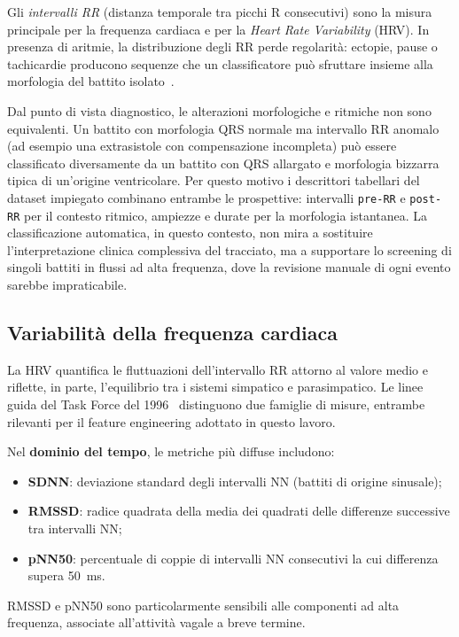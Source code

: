 Gli \emph{intervalli RR} (distanza temporale tra picchi R consecutivi) sono la misura principale per la frequenza cardiaca e per la \emph{Heart Rate Variability} (HRV).
In presenza di aritmie, la distribuzione degli RR perde regolarità: ectopie, pause o tachicardie producono sequenze che un classificatore può sfruttare insieme alla morfologia del battito isolato~\cite{taskforce1996hrv,dechazal2004automatic}.

Dal punto di vista diagnostico, le alterazioni morfologiche e ritmiche non sono equivalenti.
Un battito con morfologia QRS normale ma intervallo RR anomalo (ad esempio una extrasistole con compensazione incompleta) può essere classificato diversamente da un battito con QRS allargato e morfologia bizzarra tipica di un'origine ventricolare.
Per questo motivo i descrittori tabellari del dataset impiegato combinano entrambe le prospettive: intervalli \texttt{pre-RR} e \texttt{post-RR} per il contesto ritmico, ampiezze e durate per la morfologia istantanea.
La classificazione automatica, in questo contesto, non mira a sostituire l'interpretazione clinica complessiva del tracciato, ma a supportare lo screening di singoli battiti in flussi ad alta frequenza, dove la revisione manuale di ogni evento sarebbe impraticabile.

\subsection{Variabilità della frequenza cardiaca}

La HRV quantifica le fluttuazioni dell'intervallo RR attorno al valore medio e riflette, in parte, l'equilibrio tra i sistemi simpatico e parasimpatico.
Le linee guida del Task Force del 1996~\cite{taskforce1996hrv} distinguono due famiglie di misure, entrambe rilevanti per il feature engineering adottato in questo lavoro.

Nel \textbf{dominio del tempo}, le metriche più diffuse includono:
\begin{itemize}
  \item \textbf{SDNN}: deviazione standard degli intervalli NN (battiti di origine sinusale);
  \item \textbf{RMSSD}: radice quadrata della media dei quadrati delle differenze successive tra intervalli NN;
  \item \textbf{pNN50}: percentuale di coppie di intervalli NN consecutivi la cui differenza supera 50~ms.
\end{itemize}
RMSSD e pNN50 sono particolarmente sensibili alle componenti ad alta frequenza, associate all'attività vagale a breve termine.

